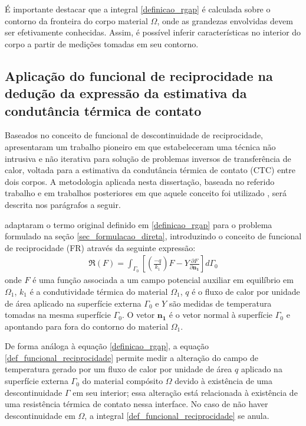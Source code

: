 É importante destacar que a integral \eqref{definicao_rgap} é calculada sobre o contorno da fronteira do corpo material $\Omega$, onde as grandezas envolvidas devem
ser efetivamente conhecidas. Assim, é possível inferir características no interior do corpo a partir de medições tomadas em seu contorno.

\subsection{Aplicação do funcional de reciprocidade na dedução da expressão da estimativa da condutância térmica de contato}\label{secao_sobre_fr}

Baseados no conceito de funcional de descontinuidade de reciprocidade, \cite{reciproc_2} apresentaram um trabalho pioneiro em que estabeleceram uma
técnica não intrusiva e não iterativa para solução de problemas inversos de transferência de calor, voltada para a estimativa da condutância térmica de
contato (CTC) entre dois corpos. A metodologia aplicada nesta dissertação, baseada no referido trabalho e em trabalhos posteriores em que aquele conceito
foi utilizado \citep{artigo_padilha_3}, será descrita nos parágrafos a seguir. 

\cite{reciproc_2} adaptaram o termo original definido em \eqref{definicao_rgap} para o problema formulado na seção \ref{sec_formulacao_direta},
introduzindo o conceito de funcional de reciprocidade (FR) através da seguinte expressão:
\begin{align}
	\Re(F) = \int_{\Gamma_0}\left[\left(\frac{-q}{k_1}\right)F - Y\frac{\partial F}{\partial\mathbf{n_1}}\right]d\Gamma_0
	\label{def_funcional_reciprocidade}
\end{align}
onde $F$ é uma função associada a um campo potencial auxiliar em equilíbrio em $\Omega_1$, $k_1$ é a condutividade térmica do material $\Omega_1$, $q$ é o fluxo de calor por unidade de área
aplicado na superfície externa $\Gamma_0$ e $Y$ são medidas de temperatura tomadas na mesma superfície $\Gamma_0$. O vetor $\mathbf{n_1}$ é o vetor normal à superfície
$\Gamma_0$ e apontando para fora do contorno do material $\Omega_1$.

De forma análoga à equação \eqref{definicao_rgap}, a equação \eqref{def_funcional_reciprocidade} permite medir a alteração do campo de temperatura
gerado por um fluxo de calor por unidade de área $q$ aplicado na superfície externa $\Gamma_0$ do material compósito $\Omega$ devido à existência
de uma descontinuidade $\Gamma$ em seu interior; essa alteração está relacionada à existência de uma resistência térmica de contato nessa interface. No caso de não haver descontinuidade
em $\Omega$, a integral \eqref{def_funcional_reciprocidade} se anula.


